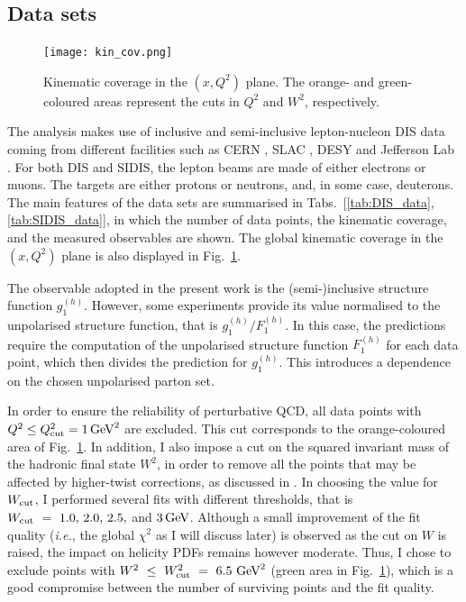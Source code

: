 \subsection*{Data sets}
\begin{figure}[t]
  \centering
  \texttt{[image: kin\_cov.png]} 
  \caption{\small{Kinematic coverage in the $(x,Q^2)$ plane. The orange- and green-coloured areas represent the cuts in $Q^2$ and $W^2$, respectively.}}
  \label{fig:kin_cov}
\end{figure}
The analysis makes use of inclusive and semi-inclusive lepton-nucleon DIS data coming from different facilities such as CERN \cite{EuropeanMuon:1989yki, SpinMuon:1999udj, COMPASS:2006mhr, COMPASS:2010wkz, COMPASS:2010hwr}, SLAC \cite{E142:1993hql, E143:1998hbs, E154:1997xfa, E155:2000qdr}, DESY \cite{HERMES:2018awh, HERMES:2006jyl, HERMES:1997hjr} and Jefferson Lab \cite{Kramer:2002tt, JeffersonLabHallA:2004tea, CLAS:2014qtg}. For both DIS and SIDIS, the lepton beams are made of either electrons or muons. The targets are either protons or neutrons, and, in some case, deuterons. The main features of the data sets are summarised in Tabs.~[\ref{tab:DIS_data}, \ref{tab:SIDIS_data}], in which the number of data points, the kinematic coverage, and the measured observables are shown. The global kinematic coverage in the $(x,Q^2)$ plane is also displayed in Fig.~\ref{fig:kin_cov}. \par
The observable adopted in the present work is the (semi-)inclusive structure function $g_1^{(h)}$. However, some experiments provide its value normalised to the unpolarised structure function, that is $g_1^{(h)}/F_1^{(h)}$. In this case, the predictions require the computation of the unpolarised structure function $F_1^{(h)}$ for each data point, which then divides the prediction for $g_1^{(h)}$. This introduces a dependence on the chosen unpolarised parton set.%

In order to ensure the reliability of perturbative QCD, all data points with $Q^2 \leq Q^2_{\textrm{cut}} = 1 \, \textrm{GeV}^2$ are excluded. This cut corresponds to the orange-coloured area of Fig.~\ref{fig:kin_cov}. In addition, I also impose a cut on the squared invariant mass of the hadronic final state $W^2$, in order to remove all the points that may be affected by higher-twist corrections, as discussed in . In choosing the value for $W_{\textrm{cut}}$, I performed several fits with different thresholds, that is $W_{\textrm{cut}}~=~1.0, \, 2.0, \, 2.5,$ and $3 \, \textrm{GeV}$. Although a small improvement of the fit quality (\textit{i.e.}, the global $\chi^2$ as I will discuss later) is observed as the cut on $W$ is raised, the impact on helicity PDFs remains however moderate. Thus, I chose to exclude points with $W^2~\leq~W^2_{\textrm{cut}}~=~6.5~\textrm{GeV}^2$ (green area in Fig.~\ref{fig:kin_cov}), which is a good compromise between the number of surviving points and the fit quality.%

